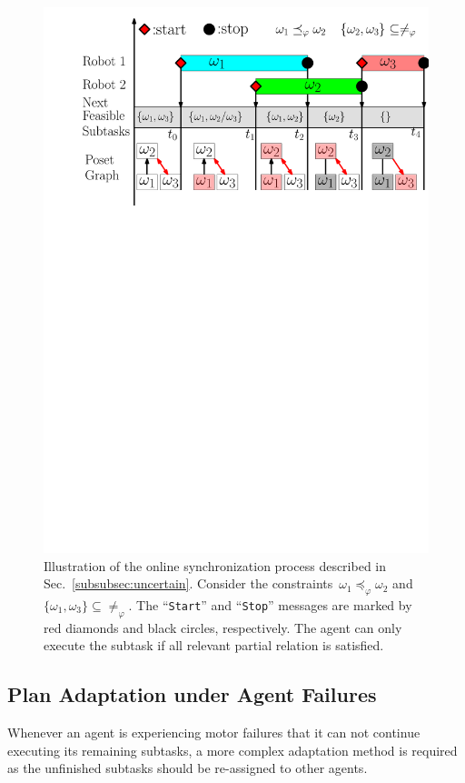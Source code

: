 \begin{figure}[t]
	\centering
	\includegraphics[width=0.8\linewidth]{figures/online_adapt3.pdf}
        \caption{
Illustration of the online synchronization process
described in Sec.~\ref{subsubsec:uncertain}.
Consider the constraints~$\omega_1 \preceq_{\varphi}\omega_2$
and~$\{\omega_1, \omega_3\}\subseteq\neq_\varphi $.
The ``\texttt{Start}'' and ``\texttt{Stop}'' messages are
marked by red diamonds and black circles, respectively. The agent can only
execute the subtask if all relevant partial relation is satisfied.}
\label{fig:online adaption}
\end{figure}


\subsection{Plan Adaptation under Agent Failures}\label{subsubsec:failure}
Whenever an agent is experiencing motor failures that it can not
continue executing its remaining subtasks,
a more complex adaptation method is required as the unfinished subtasks
should be re-assigned to other agents.

